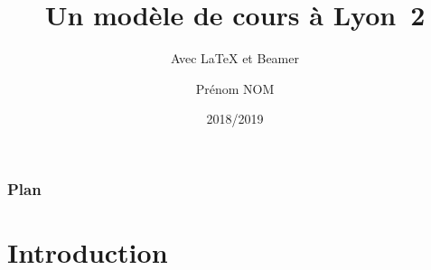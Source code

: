 \documentclass[aspectratio=169,10pt,t]{beamer}
\title{Un modèle de cours à Lyon~2}
\subtitle{Avec \LaTeX{} et Beamer}
\author{Prénom NOM}
\institute{Université Lyon~2}
\date{2018/2019}
\begin{document}
\maketitle[label=titre]

\begin{frame}
  \frametitle{Plan}
  \tableofcontents %
\end{frame}


\section*{Introduction}

\end{document}
